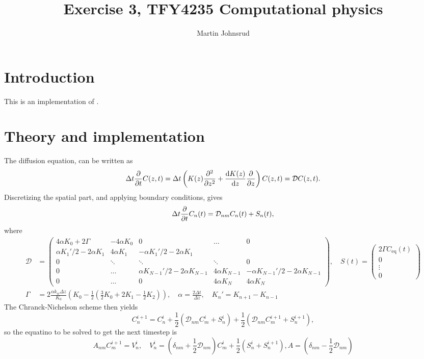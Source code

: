 \documentclass{article}
\title{Exercise 3, TFY4235 Computational physics}
\author{Martin Johnsrud}
\date{}
\begin{document}
    \maketitle
    \section*{Introduction}
        This is an implementation of \cite{exercise}.
    \section*{Theory and implementation}
    The diffusion equation, can be written as
    \begin{equation*}
        \Delta t \pdv{t} C(z, t) = \Delta t \left(K(z) \pdv[2]{z} + \dv{K(z)}{z}\pdv{z}\right) C(z, t) = \mathcal{D} C(z, t).
    \end{equation*}
    Discretizing the spatial part, and applying boundary conditions, gives
    \begin{equation*}
        \Delta t \pdv{t} C_n(t) = \mathcal{D}_{nm} C_n(t) + S_n(t),
    \end{equation*}
    where 
    \begin{align*}
        \mathcal{D} &=
        \begin{pmatrix}
            4\alpha K_0 + 2\Gamma & - 4\alpha K_0 & 0 & \dots&0 \\
            \alpha K_1'/2 - 2\alpha K_1 & 4 \alpha K_1 & - \alpha K_1'/2 - 2\alpha K_1 \\
            0 & \ddots & \ddots & \ddots & 0\\
            0 & \dots &\alpha K_{N-1}'/2 - 2\alpha K_{N-1} & 4 \alpha K_{N-1} & - \alpha K_{N-1}'/2 - 2\alpha K_{N-1} \\
             0 & \dots & 0 & 4\alpha K_N & 4\alpha K_N
        \end{pmatrix},\quad
        S(t) = 
        \begin{pmatrix}
            2\Gamma C_\mathrm{eq}(t) \\
            0\\
            \vdots \\
            0
        \end{pmatrix} \\
    \Gamma &= 2 \frac{\alpha k_w \Delta z}{K_0} \left(K_0 - \frac{1}{2}(\frac{3}{2} K_0 + 2K_1 - \frac{1}{2}K_2)\right), \quad
     \alpha = \frac{2 \Delta t}{\Delta z}, \quad
      K_n' = K_{n+1} - K_{n-1}
    \end{align*}
    The Chranck-Nichelson scheme then yields
    \begin{equation*}
        C_n^{i+1}  = C_n^i + \frac{1}{2} (\mathcal{D}_{nm} C_m^i + S_n^i) + \frac{1}{2} (\mathcal{D}_{nm} C_m^{i+1} + S_n^{i+1}),
    \end{equation*}
    so the equatino to be solved to get the next timestep is
    \begin{equation*}
        A_{nm} C_{m}^{i+1} = V_n^i, \quad V_n^i = \left(\delta_{nm} + \frac{1}{2} \mathcal{D}_{nm}\right) C_m^i + \frac{1}{2}(S_n^i + S_n^{i+1}), A = \left(\delta_{nm} - \frac{1}{2} \mathcal{D}_{nm}\right)
    \end{equation*}
    
    
\end{document}
